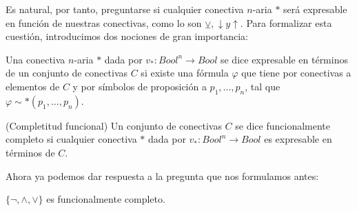\noindent Es natural, por tanto, preguntarse si cualquier conectiva $n$-aria $*$ será expresable en función de nuestras conectivas, como lo son $\veebar,\downarrow y\uparrow$. Para formalizar esta cuestión, introducimos dos nociones de gran importancia:

\begin{definition}
Una conectiva $n$-aria $*$ dada por $v_{*}: Bool^{n} \rightarrow Bool$ se dice expresable en términos de un conjunto de conectivas $C$ si existe una fórmula $\varphi$ que tiene por conectivas a elementos de $C$ y por símbolos de proposición a $p_1, ..., p_n$, tal que $\varphi \sim *(p_1, ..., p_n)$. 
\end{definition}


\begin{definition}(Completitud funcional)
Un conjunto de conectivas $C$ se dice funcionalmente completo si cualquier conectiva $*$ dada por $v_{*}: Bool^{n} \rightarrow Bool$ es expresable en términos de $C$.
\end{definition}
Ahora ya podemos dar respuesta a la pregunta que nos formulamos antes:
\begin{prop}\label{comp}
$\{\neg, \land, \lor\}$ es funcionalmente completo.
\end{prop}
